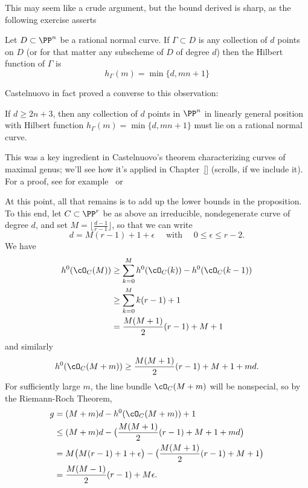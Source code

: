 This may seem like a crude argument, but the bound derived is sharp, as the following exercise asserts

\begin{exercise}
Let $D \subset \PP^n$ be a rational normal curve. If $\Gamma \subset D$ is any collection of $d$ points on $D$ (or for that matter any subscheme of $D$ of degree $d$) then the Hilbert function of $\Gamma$ is
$$
h_\Gamma(m) = \min\{d, mn+1\}
$$
\end{exercise} 

Castelnuovo in fact proved a converse to this observation:

\begin{fact}
If $d \geq 2n+3$, then any collection of $d$ points in $\PP^n$ in linearly general position with Hilbert function $h_\Gamma(m) = \min\{d, mn+1\}$ must lie on a rational normal curve. 
\end{fact}

This was a key ingredient in Castelnuovo's theorem characterizing curves of maximal genus; we'll see how it's applied in Chapter~\ref{} (scrolls, if we include it). For a proof, see for example~\cite{ACGH} or~\cite{Montreal}

At this point, all that remains is to add up the lower bounds in the proposition. To this end, let $C \subset \PP^r$ be as above an irreducible, nondegenerate curve of degree $d$, and set $M = \lfloor{\frac{d-1}{r-1}}\rfloor$, so that we can write
$$
d = M(r-1) + 1 + \epsilon \quad \text{ with } \quad 0 \leq \epsilon \leq r-2.
$$
We have 
\begin{align*}
h^0(\cO_C(M)) &\geq \sum_{k=0}^M h^0(\cO_C(k)) - h^0(\cO_C(k-1)) \\
&\geq  \sum_{k=0}^M k(r-1)+1 \\
&= \frac{M(M+1)}{2}(r-1) + M + 1
\end{align*}
and similarly
$$
h^0(\cO_C(M+m)) \geq \frac{M(M+1)}{2}(r-1) + M + 1 + md.
$$
For sufficiently large $m$, the line bundle $\cO_C(M+m)$ will be nonspecial, so by the Riemann-Roch Theorem,
\begin{align*}
g &= (M+m)d - h^0(\cO_C(M+m)) + 1 \\
&\leq (M+m)d - \bigl(  \frac{M(M+1)}{2}(r-1) + M + 1 + md \bigr) \\
& = M\bigl( M(r-1) + 1 + \epsilon \bigr) - \bigl(  \frac{M(M+1)}{2}(r-1) + M + 1 \bigr) \\
&= \frac{M(M-1)}{2}(r-1) + M\epsilon.
\end{align*}


